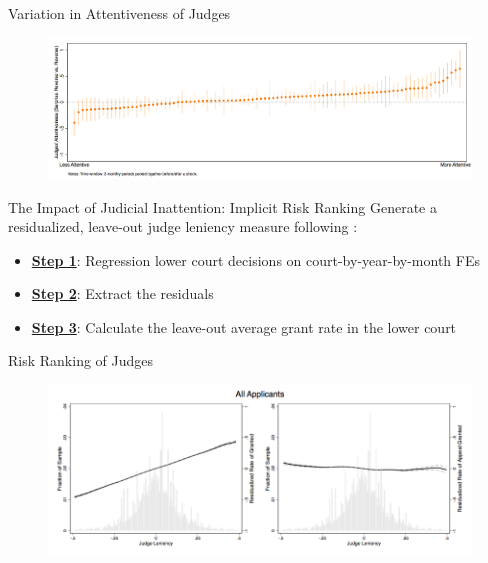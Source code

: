 \begin{frame}{Variation in Attentiveness of Judges}
    \begin{figure}
        \centering
        \includegraphics[height = 0.6 \textheight]{images/surp_reverse.png}
    \end{figure}
\end{frame}

\begin{frame}{The Impact of Judicial Inattention: Implicit Risk Ranking}
    Generate a residualized, leave-out judge leniency measure following \citet{arnold2018racial}:
    \begin{itemize}
        \item<2-> \textbf{\color{goldenrod}\underline{Step 1}}: Regression lower court decisions on court-by-year-by-month FEs
        \item<3-> \textbf{\color{goldenrod}\underline{Step 2}}: Extract the residuals
        \item<4-> \textbf{\color{goldenrod}\underline{Step 3}}: Calculate the leave-out average grant rate in the lower court
    \end{itemize}
\end{frame}

\begin{frame}{Risk Ranking of Judges}
    \begin{figure}
        \centering
        \includegraphics[height = 0.7 \textheight]{images/complete_full.png}
    \end{figure}
\end{frame}

